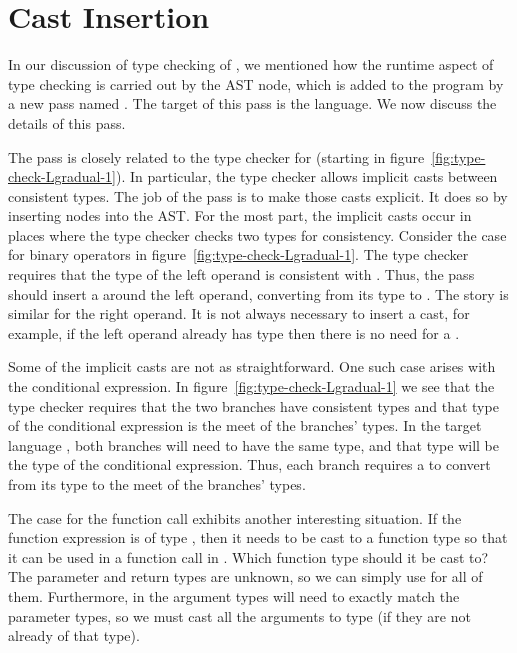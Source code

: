 \documentclass[7x10]{TimesAPriori_MIT}%
\numberwithin{theorem}{chapter}
\numberwithin{definition}{chapter}
\numberwithin{equation}{chapter}
\begin{document}
\section{Cast Insertion }
\label{sec:gradual-insert-casts}

In our discussion of type checking of \LangGrad{}, we mentioned how
the runtime aspect of type checking is carried out by the 
AST node, which is added to the program by a new pass named
. The target of this pass is the \LangCast{}
language.  We now discuss the details of this pass.

The  pass is closely related to the type checker
for \LangGrad{} (starting in figure~\ref{fig:type-check-Lgradual-1}).
In particular, the type checker allows implicit casts between
consistent types. The job of the  pass is to make
those casts explicit. It does so by inserting
 nodes into the AST.
%
For the most part, the implicit casts occur in places where the type
checker checks two types for consistency.  Consider the case for
binary operators in figure~\ref{fig:type-check-Lgradual-1}. The type
checker requires that the type of the left operand is consistent with
\INTTY{}. Thus, the  pass should insert a
 around the left operand, converting from its type to
\INTTY{}. The story is similar for the right operand. It is not always
necessary to insert a cast, for example, if the left operand already has type
\INTTY{} then there is no need for a .

Some of the implicit casts are not as straightforward. One such case
arises with the
conditional expression. In figure~\ref{fig:type-check-Lgradual-1} we
see that the type checker requires that the two branches have
consistent types and that type of the conditional expression is the
meet of the branches' types. In the target language \LangCast{}, both
branches will need to have the same type, and that type
will be the type of the conditional expression. Thus, each branch requires
a  to convert from its type to the meet of the branches' types.

The case for the function call exhibits another interesting situation. If
the function expression is of type \CANYTY{}, then it needs to be cast
to a function type so that it can be used in a function call in
\LangCast{}. Which function type should it be cast to? The parameter
and return types are unknown, so we can simply use \CANYTY{} for all
of them. Furthermore, in \LangCast{} the argument types will need to
exactly match the parameter types, so we must cast all the arguments
to type \CANYTY{} (if they are not already of that type).
\end{document}

